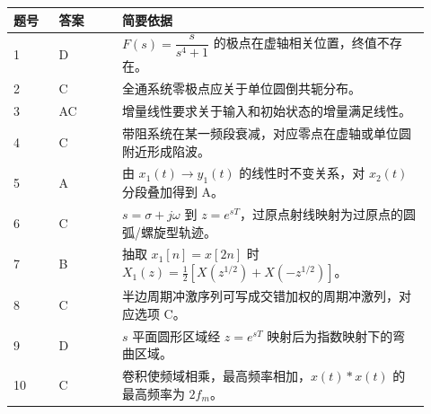 \documentclass[11pt]{ctexart}
\begin{document}
\begin{center}

\footnotesize

\begin{longtable}{p{0.10\linewidth} p{0.14\linewidth} p{0.68\linewidth}}

\toprule

题号 & 答案 & 简要依据 \\

\midrule

1 & D & \(F(s)=\dfrac{s}{s^4+1}\) 的极点在虚轴相关位置，终值不存在。 \\

\addlinespace[1pt]

2 & C & 全通系统零极点应关于单位圆倒共轭分布。 \\

\addlinespace[1pt]

3 & AC & 增量线性要求关于输入和初始状态的增量满足线性。 \\

\addlinespace[1pt]

4 & C & 带阻系统在某一频段衰减，对应零点在虚轴或单位圆附近形成陷波。 \\

\addlinespace[1pt]

5 & A & 由 \(x_1(t)\to y_1(t)\) 的线性时不变关系，对 \(x_2(t)\) 分段叠加得到 A。 \\

\addlinespace[1pt]

6 & C & \(s=\sigma+j\omega\) 到 \(z=e^{sT}\)，过原点射线映射为过原点的圆弧/螺旋型轨迹。 \\

\addlinespace[1pt]

7 & B & 抽取 \(x_1[n]=x[2n]\) 时 \(X_1(z)=\frac{1}{2}\left[X(z^{1/2})+X(-z^{1/2})\right]\)。 \\

\addlinespace[1pt]

8 & C & 半边周期冲激序列可写成交错加权的周期冲激列，对应选项 C。 \\

\addlinespace[1pt]

9 & D & \(s\) 平面圆形区域经 \(z=e^{sT}\) 映射后为指数映射下的弯曲区域。 \\

\addlinespace[1pt]

10 & C & 卷积使频域相乘，最高频率相加，\(x(t)*x(t)\) 的最高频率为 \(2f_m\)。 \\


\end{longtable}
\end{center}
\end{document}
